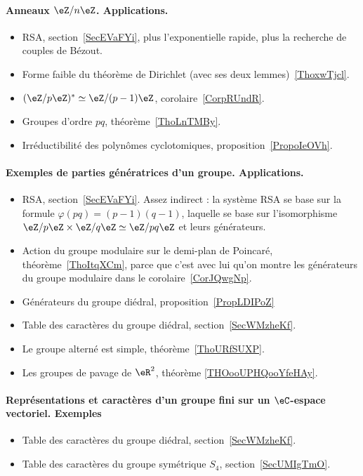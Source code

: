 \paragraph{Anneaux $\eZ/n\eZ$. Applications.}
\begin{itemize}
    \item RSA, section~\ref{SecEVaFYi}, plus l'exponentielle rapide, plus la recherche de couples de Bézout.
    \item Forme faible du théorème de Dirichlet (avec ses deux lemmes)~\ref{ThoxwTjcl}.
    \item \( (\eZ/p\eZ)^*\simeq \eZ/(p-1)\eZ\), corolaire~\ref{CorpRUndR}.
    \item Groupes d'ordre \( pq\), théorème~\ref{ThoLnTMBy}.
    \item Irréductibilité des polynômes cyclotomiques, proposition~\ref{PropoIeOVh}.
\end{itemize}
\paragraph{Exemples de parties génératrices d'un groupe. Applications.}
\begin{itemize}
    \item RSA, section~\ref{SecEVaFYi}. Assez indirect : la système RSA se base sur la formule \( \varphi(pq)=(p-1)(q-1)\), laquelle se base sur l'isomorphisme \( \eZ/p\eZ\times \eZ/q\eZ\simeq \eZ/pq\eZ\) et leurs générateurs.
    \item Action du groupe modulaire sur le demi-plan de Poincaré, théorème~\ref{ThoItqXCm}, parce que c'est avec lui qu'on montre les générateurs du groupe modulaire dans le corolaire~\ref{CorJQwgNp}.
    \item Générateurs du groupe diédral, proposition~\ref{PropLDIPoZ}
    \item Table des caractères du groupe diédral, section~\ref{SecWMzheKf}.
    \item Le groupe alterné est simple, théorème~\ref{ThoURfSUXP}.
    \item Les groupes de pavage de \( \eR^2\), théorème \ref{THOooUPHQooYfeHAy}.
\end{itemize}
\paragraph{Représentations et caractères d'un groupe fini sur un \( \eC\)-espace vectoriel. Exemples}
\begin{itemize}
    \item Table des caractères du groupe diédral, section~\ref{SecWMzheKf}.
    \item Table des caractères du groupe symétrique \( S_4\), section~\ref{SecUMIgTmO}.
\end{itemize}
